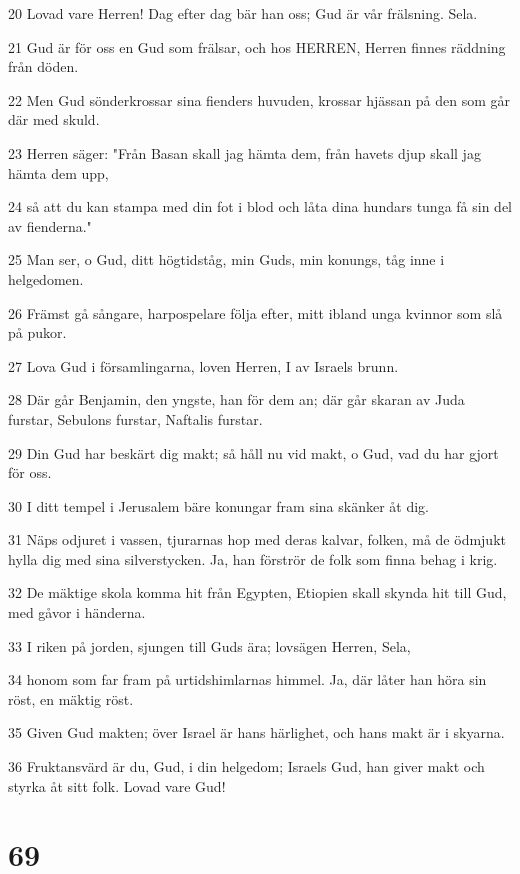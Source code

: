 \par 20 Lovad vare Herren! Dag efter dag bär han oss; Gud är vår frälsning. Sela.
\par 21 Gud är för oss en Gud som frälsar, och hos HERREN, Herren finnes räddning från döden.
\par 22 Men Gud sönderkrossar sina fienders huvuden, krossar hjässan på den som går där med skuld.
\par 23 Herren säger: "Från Basan skall jag hämta dem, från havets djup skall jag hämta dem upp,
\par 24 så att du kan stampa med din fot i blod och låta dina hundars tunga få sin del av fienderna."
\par 25 Man ser, o Gud, ditt högtidståg, min Guds, min konungs, tåg inne i helgedomen.
\par 26 Främst gå sångare, harpospelare följa efter, mitt ibland unga kvinnor som slå på pukor.
\par 27 Lova Gud i församlingarna, loven Herren, I av Israels brunn.
\par 28 Där går Benjamin, den yngste, han för dem an; där går skaran av Juda furstar, Sebulons furstar, Naftalis furstar.
\par 29 Din Gud har beskärt dig makt; så håll nu vid makt, o Gud, vad du har gjort för oss.
\par 30 I ditt tempel i Jerusalem bäre konungar fram sina skänker åt dig.
\par 31 Näps odjuret i vassen, tjurarnas hop med deras kalvar, folken, må de ödmjukt hylla dig med sina silverstycken. Ja, han förströr de folk som finna behag i krig.
\par 32 De mäktige skola komma hit från Egypten, Etiopien skall skynda hit till Gud, med gåvor i händerna.
\par 33 I riken på jorden, sjungen till Guds ära; lovsägen Herren, Sela,
\par 34 honom som far fram på urtidshimlarnas himmel. Ja, där låter han höra sin röst, en mäktig röst.
\par 35 Given Gud makten; över Israel är hans härlighet, och hans makt är i skyarna.
\par 36 Fruktansvärd är du, Gud, i din helgedom; Israels Gud, han giver makt och styrka åt sitt folk. Lovad vare Gud!

\chapter{69}


